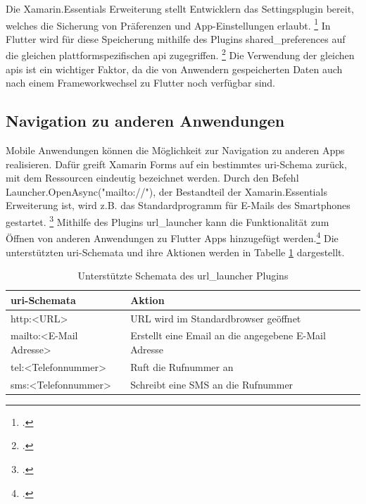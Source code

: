 Die Xamarin.Essentials Erweiterung stellt Entwicklern das \glq Settingsplugin\grq{} bereit, welches die Sicherung von Präferenzen und App-Einstellungen erlaubt.  \footcite[Vgl.][Abgerufen am \today]{MicrosoftXamSettings2019} In Flutter wird für diese Speicherung mithilfe des Plugins \glq shared\_preferences\grq{}  auf die gleichen plattformspezifischen \ac{api} zugegriffen.  \footcite[Vgl.][Abgerufen am \today]{GoogleFlutterSharedPreferences2020}  Die Verwendung der gleichen \acp{api} ist ein wichtiger Faktor, da die von Anwendern gespeicherten Daten  auch nach einem Frameworkwechsel zu Flutter noch verfügbar sind. 

\subsection{Navigation zu anderen Anwendungen}
\label{sec:nav}

Mobile Anwendungen können die Möglichkeit zur Navigation zu anderen Apps realisieren.  Dafür greift Xamarin Forms auf ein bestimmtes \ac{uri}-Schema zurück, mit dem Ressourcen eindeutig bezeichnet werden.  Durch den Befehl \glq Launcher.OpenAsync("mailto://")\grq{}, der Bestandteil der Xamarin.Essentials Erweiterung ist,  wird z.B.  das Standardprogramm für E-Mails des Smartphones gestartet. \footcite[Vgl.][Abgerufen am \today]{MicrosoftLauncher2020}  Mithilfe des Plugins \glq url\_launcher\grq{} kann die Funktionalität zum Öffnen von anderen Anwendungen zu Flutter Apps hinzugefügt werden.\footcite[Vgl.][Abgerufen am \today]{Googleurllauncher2020} Die unterstützten \ac{uri}-Schemata und ihre Aktionen werden in Tabelle \ref{tab:URISChema} dargestellt.

\begin{table}[!ht]
\begin{tabularx}{\textwidth}{|l|X|}
\hline
   \textbf{\ac{uri}-Schemata} & \textbf{Aktion}  \\
\hline
	http:<URL>		       				&  	URL wird im Standardbrowser geöffnet 		\\ 
	mailto:<E-Mail Adresse>		     		&  	Erstellt eine Email an die angegebene E-Mail Adresse 		\\ 
	tel:<Telefonnummer>	       		&  	Ruft die Rufnummer an 		\\ 
	sms:<Telefonnummer>		       		&  	Schreibt eine SMS an die Rufnummer		\\ 
	\hline
\end{tabularx}
\caption{Unterstützte Schemata des \glq url\_launcher\grq{} Plugins}
 \label{tab:URISChema}
\end{table}


